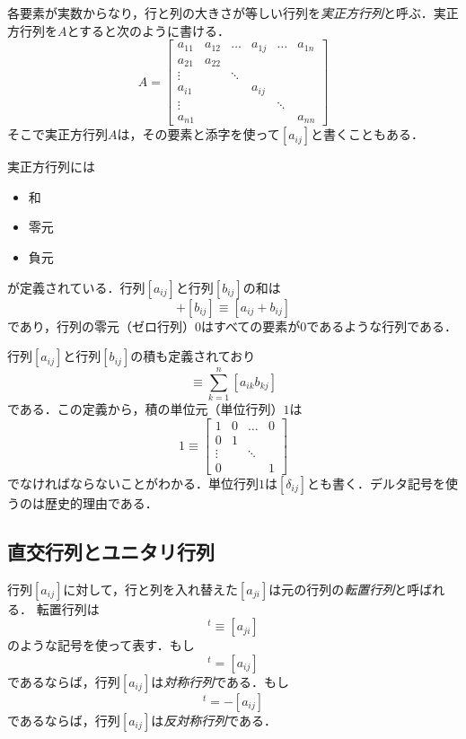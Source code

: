 \documentclass{jsbook}
\newcommand{\keyword}[1]{\emph{#1}}
\newcommand{\Zero}{0}%
\newcommand{\One}{1}%
\begin{document}
各要素が実数からなり，行と列の大きさが等しい行列を\keyword{実正方行列}と呼ぶ．実正方行列を$A$とすると次のように書ける．
\begin{equation}
A=\begin{bmatrix}a_{11}&a_{12}&\dots&a_{1j}&\dots&a_{1n}\\
  a_{21}&a_{22}\\
  \vdots&&\ddots\\
  a_{i1}&&&a_{ij}\\
  \vdots&&&&\ddots\\
  a_{n1}&&&&&a_{nn}\end{bmatrix}
\end{equation}
そこで実正方行列$A$は，その要素と添字を使って$[a_{ij}]$と書くこともある．

実正方行列には
\begin{itemize}
\item 和
\item 零元
\item 負元
\end{itemize}
が定義されている．行列$[a_{ij}]$と行列$[b_{ij}]$の和は
\begin{equation}
[a_{ij}]+[b_{ij}]\equiv[a_{ij}+b_{ij}]
\end{equation}
であり，行列の零元（ゼロ行列）$\Zero$はすべての要素が$0$であるような行列である．

行列$[a_{ij}]$と行列$[b_{ij}]$の積も定義されており
\begin{equation}
[a_{ij}][b_{ij}]\equiv\sum_{k=1}^n[a_{ik}b_{kj}]
\end{equation}
である．この定義から，積の単位元（単位行列）$\One$は
\begin{equation}
\One\equiv\begin{bmatrix}1&0&\dots&0\\
  0&1\\
  \vdots&&\ddots\\
  0&&&1\end{bmatrix}
\end{equation}
でなければならないことがわかる．単位行列$\One$は$[\delta_{ij}]$とも書く．デルタ記号を使うのは歴史的理由である．

\subsection{直交行列とユニタリ行列}

行列$[a_{ij}]$に対して，行と列を入れ替えた$[a_{ji}]$は元の行列の\keyword{転置行列}と呼ばれる．
転置行列は
\begin{equation}
[a_{ij}]^t\equiv[a_{ji}]
\end{equation}
のような記号を使って表す．もし
\begin{equation}
[a_{ij}]^t=[a_{ij}]
\end{equation}
であるならば，行列$[a_{ij}]$は\keyword{対称行列}である．もし
\begin{equation}
[a_{ij}]^t=-[a_{ij}]
\end{equation}
であるならば，行列$[a_{ij}]$は\keyword{反対称行列}である．
\end{document}
